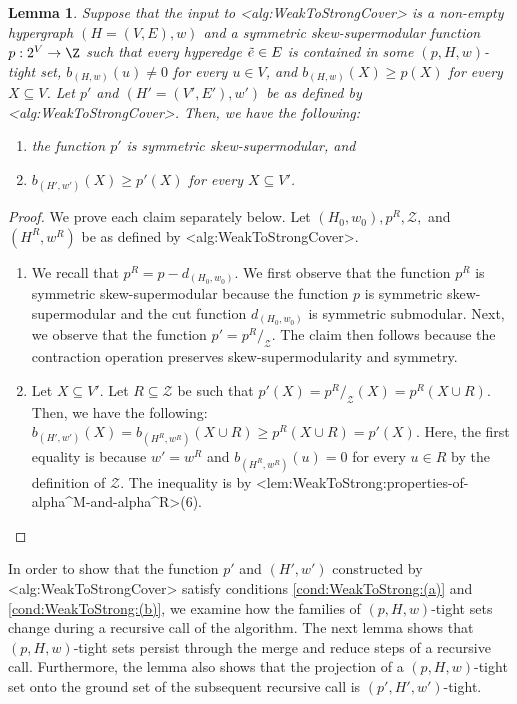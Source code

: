 \documentclass{article}
\def\Cref#1{<#1>}%
\newtheorem{lemma}{Lemma}[section]
\newcommand{\zeros}{\ensuremath{\mathcal{Z}}\xspace}
\newcommand{\tightSetFamily}[1]{\ensuremath{T_{#1}}\xspace}
\newcommand{\functionContract}[2]{\ensuremath{{#1}/_{#2}}\xspace}
\begin{document}
\begin{lemma}\label{lem:weak-to-strong-cover:next-recursive-call-hypothesis-satification:symm-skew-supermod-strong-cover}
Suppose that the input to \Cref{alg:WeakToStrongCover} is a non-empty hypergraph $(H = (V, E), w)$ and a symmetric skew-supermodular function $p:2^V\rightarrow \Z$ %
such that every hyperedge $\Tilde{e} \in E$ is contained in some $(p, H, w)$-tight set, $b_{(H,w)}(u) \not = 0$ for every $u \in V$, and $b_{(H,w)}(X) \geq p(X)$ for every $X \subseteq V$. 
Let $p'$ and $(H' = (V', E'), w')$ be as defined by \Cref{alg:WeakToStrongCover}. Then, we have the following:
\begin{enumerate}
    \item the function $p'$ is symmetric skew-supermodular, and
    \item $b_{(H', w')}(X) \geq p'(X)$ for every $X \subseteq V'$.
\end{enumerate}
\end{lemma}
\begin{proof} We prove each claim separately below. Let $(H_0, w_0), p^R, \zeros,$ and $(H^R, w^R)$ be as defined by \Cref{alg:WeakToStrongCover}.
\begin{enumerate}
    \item We recall that $p^R =  p - d_{(H_0, w_0)}$. We first observe that the function $p^R$ is symmetric skew-supermodular because the function $p$ is symmetric skew-supermodular and the cut function $d_{(H_0, w_0)}$ is symmetric submodular. Next, we observe that the function $p' = \functionContract{p^R}{\zeros}$. The claim then follows because the contraction operation preserves skew-supermodularity and symmetry.
    \item Let $X \subseteq V'$. Let $R \subseteq \zeros$ be such that $p'(X) = \functionContract{p^R}{\zeros}(X) = p^R(X \cup R)$. Then, we have the following: $b_{(H', w')}(X) = b_{(H^R, w^R)}(X \cup R) \geq p^R(X \cup R) = p'(X)$. Here, the first equality is because $w' = w^R$ and $b_{(H^R, w^R)}(u) = 0$ for every $u \in R$ by the definition of $\zeros$. The inequality is by \Cref{lem:WeakToStrong:properties-of-alpha^M-and-alpha^R}(6).  
\end{enumerate}
\end{proof}

In order to show that the function $p'$ and $(H',w')$ constructed by \Cref{alg:WeakToStrongCover} satisfy conditions \ref{cond:WeakToStrong:(a)} and \ref{cond:WeakToStrong:(b)}, we examine how the families of $(p, H, w)$-tight sets change during a recursive call of the algorithm. 
The next lemma shows that $(p, H, w)$-tight sets persist through the merge and reduce steps of a recursive call. Furthermore, the lemma also shows that the projection of a $(p, H, w)$-tight set onto the ground set of the subsequent recursive call is  $(p', H', w')$-tight.
\end{document}
